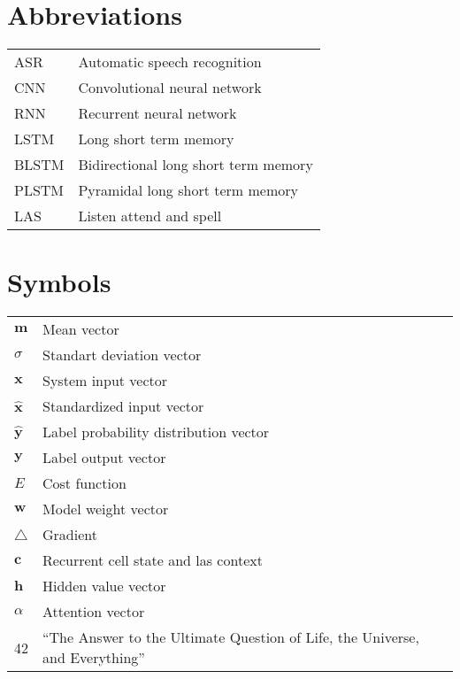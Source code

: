 \documentclass[master=ewit,english]{kulemt}
\begin{document}
\section*{Abbreviations}
\begin{flushleft}
  \renewcommand{\arraystretch}{1.1}
  \begin{tabularx}{\textwidth}{@{}p{12mm}X@{}}
    ASR   & Automatic speech recognition \\
    CNN   & Convolutional neural network \\
    RNN   & Recurrent neural network \\
    LSTM  & Long short term memory \\
    BLSTM & Bidirectional long short term memory \\
    PLSTM & Pyramidal long short term memory \\
    LAS	  & Listen attend and spell \\
  \end{tabularx}
\end{flushleft}
\section*{Symbols}
\begin{flushleft}
  \renewcommand{\arraystretch}{1.1}
  \begin{tabularx}{\textwidth}{@{}p{12mm}X@{}}
	$\mathbf{m}$ & Mean vector \\
	$\sigma$	 & Standart deviation vector \\
	$\mathbf{x}$ & System input vector \\
	$\hat{\mathbf{x}}$ & Standardized input vector \\
	$\hat{\mathbf{y}}$ & Label probability distribution vector \\
	$\mathbf{y}$ & Label output vector \\
	$E$			 & Cost function \\
	$\mathbf{w}$ & Model weight vector \\
	$\triangle$	 & Gradient \\
	$\mathbf{c}$  & Recurrent cell state and las context \\
	$\mathbf{h}$  & Hidden value vector \\
	$\alpha$	 & Attention vector \\

    42    & ``The Answer to the Ultimate Question of Life, the Universe,
            and Everything'' \\

  \end{tabularx}
\end{flushleft}
\end{document}
